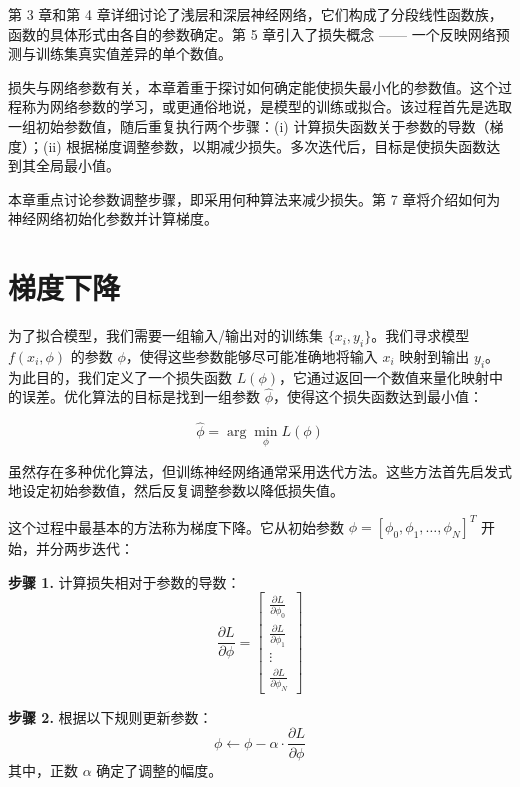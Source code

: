 \documentclass[lang=cn,newtx,10pt,scheme=chinese]{elegantbook}
\begin{document}
第 3 章和第 4 章详细讨论了浅层和深层神经网络，它们构成了分段线性函数族，函数的具体形式由各自的参数确定。第 5 章引入了损失概念 —— 一个反映网络预测与训练集真实值差异的单个数值。

损失与网络参数有关，本章着重于探讨如何确定能使损失最小化的参数值。这个过程称为网络参数的学习，或更通俗地说，是模型的训练或拟合。该过程首先是选取一组初始参数值，随后重复执行两个步骤：(i) 计算损失函数关于参数的导数（梯度）；(ii) 根据梯度调整参数，以期减少损失。多次迭代后，目标是使损失函数达到其全局最小值。

本章重点讨论参数调整步骤，即采用何种算法来减少损失。第 7 章将介绍如何为神经网络初始化参数并计算梯度。

\section{梯度下降}
为了拟合模型，我们需要一组输入/输出对的训练集 \(\{x_i, y_i\}\)。我们寻求模型 \(f(x_i, \phi)\) 的参数 \(\phi\)，使得这些参数能够尽可能准确地将输入 \(x_i\) 映射到输出 \(y_i\)。为此目的，我们定义了一个损失函数 \(L(\phi)\)，它通过返回一个数值来量化映射中的误差。优化算法的目标是找到一组参数 \(\hat{\phi}\)，使得这个损失函数达到最小值：

\begin{equation}
\hat{\phi} = \arg\min_{\phi} L(\phi) 
\end{equation}


虽然存在多种优化算法，但训练神经网络通常采用迭代方法。这些方法首先启发式地设定初始参数值，然后反复调整参数以降低损失值。

这个过程中最基本的方法称为梯度下降。它从初始参数 \(\phi = [\phi_0, \phi_1, \ldots, \phi_N]^T\) 开始，并分两步迭代：

\textbf{步骤 1.} 计算损失相对于参数的导数：
\begin{equation}
\frac{\partial L}{\partial \phi} =
\begin{bmatrix}
\frac{\partial L}{\partial \phi_0}  \\
\frac{\partial L}{\partial \phi_1}  \\
\vdots  \\
\frac{\partial L}{\partial \phi_N} 
\end{bmatrix} 
\end{equation}

\textbf{步骤 2.} 根据以下规则更新参数：
\begin{equation}
\phi \leftarrow \phi - \alpha \cdot \frac{\partial L}{\partial \phi} 
\end{equation}
其中，正数 \(\alpha\) 确定了调整的幅度。
\end{document}
